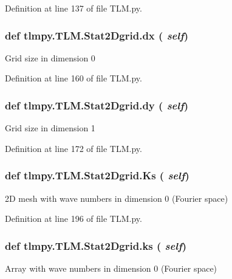Definition at line 137 of file TLM.py.\hypertarget{classtlmpy_1_1TLM_1_1Stat2Dgrid_a42272d2fdc87cdfd7137780e7466e3d5}{
\subsubsection[{dx}]{\setlength{\rightskip}{0pt plus 5cm}def tlmpy.TLM.Stat2Dgrid.dx ( {\em self})}}
\label{classtlmpy_1_1TLM_1_1Stat2Dgrid_a42272d2fdc87cdfd7137780e7466e3d5}
\begin{DoxyVerb}Grid size in dimension 0\end{DoxyVerb}
 

Definition at line 160 of file TLM.py.\hypertarget{classtlmpy_1_1TLM_1_1Stat2Dgrid_abd921e56cea0e87c8a491de025e222ba}{
\subsubsection[{dy}]{\setlength{\rightskip}{0pt plus 5cm}def tlmpy.TLM.Stat2Dgrid.dy ( {\em self})}}
\label{classtlmpy_1_1TLM_1_1Stat2Dgrid_abd921e56cea0e87c8a491de025e222ba}
\begin{DoxyVerb}Grid size in dimension 1\end{DoxyVerb}
 

Definition at line 172 of file TLM.py.\hypertarget{classtlmpy_1_1TLM_1_1Stat2Dgrid_a49e8df00887adefabbe405428d10bc2d}{
\subsubsection[{Ks}]{\setlength{\rightskip}{0pt plus 5cm}def tlmpy.TLM.Stat2Dgrid.Ks ( {\em self})}}
\label{classtlmpy_1_1TLM_1_1Stat2Dgrid_a49e8df00887adefabbe405428d10bc2d}
\begin{DoxyVerb}2D mesh with wave numbers in dimension 0 (Fourier space)\end{DoxyVerb}
 

Definition at line 196 of file TLM.py.\hypertarget{classtlmpy_1_1TLM_1_1Stat2Dgrid_a774a64499cb878d030869829b06a3f1d}{
\subsubsection[{ks}]{\setlength{\rightskip}{0pt plus 5cm}def tlmpy.TLM.Stat2Dgrid.ks ( {\em self})}}
\label{classtlmpy_1_1TLM_1_1Stat2Dgrid_a774a64499cb878d030869829b06a3f1d}
\begin{DoxyVerb}Array with wave numbers in dimension 0 (Fourier space)\end{DoxyVerb}
 

